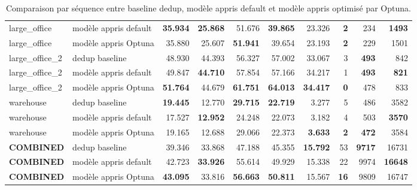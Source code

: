 \documentclass[11pt,a4paper]{article}
\begin{document}
\begin{table}[H]
{\begin{tabular}{l l r r r r r r r r}
large\_office & modèle appris default & \textbf{35.934} & \textbf{25.868} & 51.676 & \textbf{39.865} & 23.326 & \textbf{2} & 234 & \textbf{1493} \\
large\_office & modèle appris Optuna & 35.880 & 25.607 & \textbf{51.941} & 39.654 & 23.193 & \textbf{2} & 229 & 1501 \\
\midrule
large\_office\_2 & dedup baseline & 48.930 & 44.393 & 56.327 & 57.002 & 33.067 & 3 & \textbf{493} & 842 \\
large\_office\_2 & modèle appris default & 49.847 & \textbf{44.710} & 57.854 & 57.166 & 34.217 & 1 & \textbf{493} & \textbf{821} \\
large\_office\_2 & modèle appris Optuna & \textbf{51.764} & 44.679 & \textbf{61.751} & \textbf{64.013} & \textbf{34.417} & \textbf{0} & 478 & 833 \\
\midrule
warehouse & dedup baseline & \textbf{19.445} & 12.770 & \textbf{29.715} & \textbf{22.719} & 3.277 & 5 & 486 & 3582 \\
warehouse & modèle appris default & 17.527 & \textbf{12.952} & 24.248 & 22.073 & 3.182 & 4 & 503 & \textbf{3570} \\
warehouse & modèle appris Optuna & 19.165 & 12.688 & 29.066 & 22.373 & \textbf{3.633} & \textbf{2} & \textbf{472} & 3584 \\
\midrule
\textbf{COMBINED} & dedup baseline & 39.346 & 33.868 & 47.188 & 45.355 & \textbf{15.792} & 53 & \textbf{9717} & 16731 \\
\textbf{COMBINED} & modèle appris default & 42.723 & \textbf{33.926} & 55.614 & 49.929 & 15.338 & 22 & 9974 & \textbf{16648} \\
\textbf{COMBINED} & modèle appris Optuna & \textbf{43.095} & 33.816 & \textbf{56.663} & \textbf{50.811} & 15.567 & \textbf{16} & 9809 & 16747 \\
\bottomrule
\end{tabular}
}
\caption{Comparaison par séquence entre baseline dedup, modèle appris default et modèle appris optimisé par Optuna.}
\end{table}

\begin{table}[H]
\centering
{}
\caption{Comparaison COMBINED entre baseline dedup, modèle appris default et modèle appris optimisé par Optuna.}
\end{table}
\end{document}
